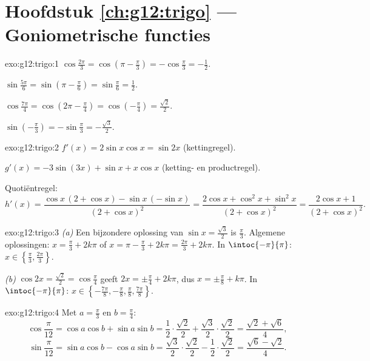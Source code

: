 \section*{Hoofdstuk \ref{ch:g12:trigo} --- Goniometrische functies}

\begin{solution}{exo:g12:trigo:1}
$\cos\frac{2\pi}{3} = \cos\left(\pi - \frac\pi3\right) = -\cos\frac\pi3
= -\frac12$.

$\sin\frac{5\pi}{6} = \sin\left(\pi - \frac\pi6\right) = \sin\frac\pi6
= \frac12$.

$\cos\frac{7\pi}{4} = \cos\left(2\pi - \frac{\pi}{4}\right)
= \cos\left(-\frac\pi4\right) = \frac{\sqrt2}{2}$.

$\sin\left(-\frac\pi3\right) = -\sin\frac\pi3 = -\frac{\sqrt3}{2}$.
\end{solution}

\begin{solution}{exo:g12:trigo:2}
$f'(x) = 2\sin x\cos x = \sin 2x$ (kettingregel).

$g'(x) = -3\sin(3x) + \sin x + x\cos x$ (ketting- en productregel).

Quotiëntregel:
\[
h'(x) = \frac{\cos x\,(2 + \cos x) - \sin x\,(-\sin x)}{(2+\cos x)^2}
= \frac{2\cos x + \cos^2 x + \sin^2 x}{(2+\cos x)^2}
= \frac{2\cos x + 1}{(2+\cos x)^2}.
\]
\end{solution}

\begin{solution}{exo:g12:trigo:3}
\emph{(a)} Een bijzondere oplossing van $\sin x = \frac{\sqrt3}{2}$ is
$\frac\pi3$. Algemene oplossingen: $x = \frac\pi3 + 2k\pi$ of
$x = \pi - \frac\pi3 + 2k\pi = \frac{2\pi}{3} + 2k\pi$. In
$\intoc{-\pi}{\pi}$: $x \in \left\{\frac\pi3, \frac{2\pi}{3}\right\}$.

\emph{(b)} $\cos 2x = \frac{\sqrt2}{2} = \cos\frac\pi4$ geeft
$2x = \pm\frac\pi4 + 2k\pi$, dus $x = \pm\frac\pi8 + k\pi$. In
$\intoc{-\pi}{\pi}$:
$x \in \left\{-\frac{7\pi}{8}, -\frac\pi8, \frac\pi8,
\frac{7\pi}{8}\right\}$.
\end{solution}

\begin{solution}{exo:g12:trigo:4}
Met $a = \frac\pi3$ en $b = \frac\pi4$:
\[
\cos\frac{\pi}{12} = \cos a\cos b + \sin a \sin b
= \frac12\cdot\frac{\sqrt2}{2} + \frac{\sqrt3}{2}\cdot\frac{\sqrt2}{2}
= \frac{\sqrt2 + \sqrt6}{4},
\]
\[
\sin\frac{\pi}{12} = \sin a\cos b - \cos a \sin b
= \frac{\sqrt3}{2}\cdot\frac{\sqrt2}{2} - \frac12\cdot\frac{\sqrt2}{2}
= \frac{\sqrt6 - \sqrt2}{4}.
\]
\end{solution}

